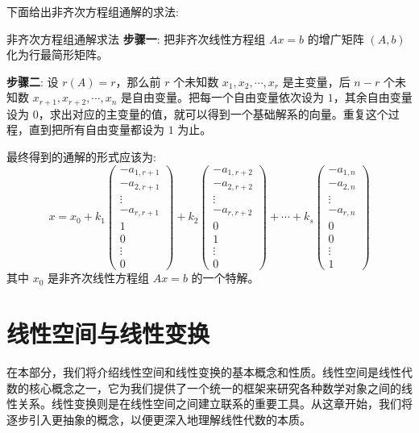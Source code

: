 \documentclass[a4paper,12pt]{ctexart}
\begin{document}
下面给出非齐次方程组通解的求法:

\begin{myalgo}{非齐次方程组通解求法}{}
\textbf{步骤一}: 把非齐次线性方程组 $Ax=b$ 的增广矩阵 $(A,b)$ 化为行最简形矩阵。

\textbf{步骤二}: 设 $r(A) = r$，那么前 $r$ 个未知数 $x_1, x_2, \cdots, x_r$ 是主变量，后 $n-r$ 个未知数 $x_{r+1}, x_{r+2}, \cdots, x_n$ 是自由变量。把每一个自由变量依次设为 $1$，其余自由变量设为 $0$，求出对应的主变量的值，就可以得到一个基础解系的向量。重复这个过程，直到把所有自由变量都设为 $1$ 为止。

最终得到的通解的形式应该为:
\[
x = x_0 + k_1 \begin{pmatrix}
-a_{1, r+1} \\ -a_{2, r+1} \\ \vdots \\ -a_{r, r+1} \\ 1 \\ 0 \\ \vdots \\ 0
\end{pmatrix} + k_2 \begin{pmatrix}
-a_{1, r+2} \\ -a_{2, r+2} \\ \vdots \\ -a_{r, r+2} \\ 0 \\ 1 \\ \vdots \\ 0
\end{pmatrix} + \cdots + k_{s} \begin{pmatrix}
-a_{1, n} \\ -a_{2, n} \\ \vdots \\ -a_{r, n} \\ 0 \\ 0 \\ \vdots \\ 1
\end{pmatrix}
\]
其中 $x_0$ 是非齐次线性方程组 $Ax=b$ 的一个特解。
\end{myalgo}

\newpage

\section{线性空间与线性变换}

在本部分，我们将介绍线性空间和线性变换的基本概念和性质。线性空间是线性代数的核心概念之一，它为我们提供了一个统一的框架来研究各种数学对象之间的线性关系。线性变换则是在线性空间之间建立联系的重要工具。从这章开始，我们将逐步引入更抽象的概念，以便更深入地理解线性代数的本质。
\end{document}

